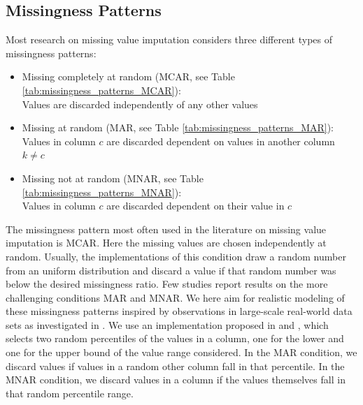 \documentclass[utf8]{frontiersSCNS} %
\begin{document}
\subsection{Missingness Patterns}
\label{sec:missingess_pattern}
Most research on missing value imputation considers three different types of missingness patterns:
%
\begin{itemize}
	\item Missing completely at random (MCAR, see Table \ref{tab:missingness_patterns_MCAR}): \\
	Values are discarded independently of any other values
	\item Missing at random (MAR, see Table \ref{tab:missingness_patterns_MAR}): \\
	Values in column $c$ are discarded dependent on values in another column $k\neq c$
	\item Missing not at random (MNAR, see Table \ref{tab:missingness_patterns_MNAR}): \\
	Values in column $c$ are discarded dependent on their value in $c$
\end{itemize}
%
The missingness pattern most often used in the literature on missing value imputation is MCAR. Here the missing values are chosen independently at random. Usually, the implementations of this condition draw a random number from an uniform distribution and discard a value if that random number was below the desired missingness ratio. Few studies report results on the more challenging conditions MAR and MNAR. We here aim for realistic modeling of these missingness patterns inspired by observations in large-scale real-world data sets as investigated in \cite{Biessmann2018a}. We use an implementation proposed in \cite{Schelter2020a} and \cite{Jenga}, which selects two random percentiles of the values in a column, one for the lower and one for the upper bound of the value range considered. In the MAR condition, we discard values if values in a random other column fall in that percentile. In the MNAR condition, we discard values in a column if the values themselves fall in that random percentile range.
%
\end{document}
